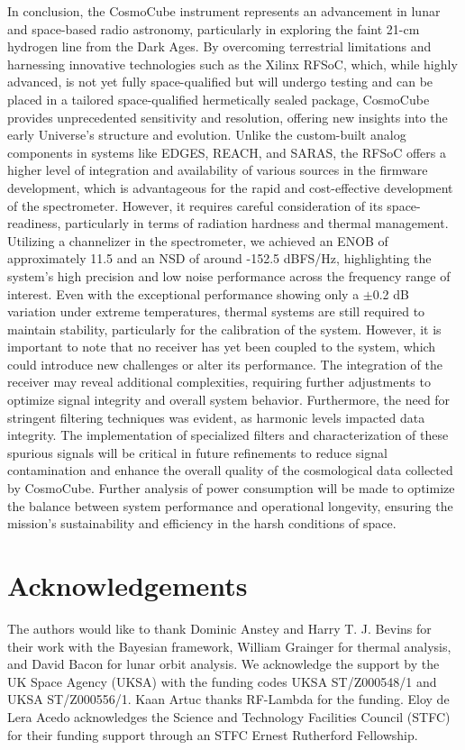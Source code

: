 \documentclass[fleqn,usenatbib]{rasti}
\begin{document}
In conclusion, the CosmoCube instrument represents an advancement in lunar and space-based radio astronomy, particularly in exploring the faint 21-cm hydrogen line from the Dark Ages. By overcoming terrestrial limitations and harnessing innovative technologies such as the Xilinx RFSoC, which, while highly advanced, is not yet fully space-qualified but will undergo testing and can be placed in a tailored space-qualified hermetically sealed package, CosmoCube provides unprecedented sensitivity and resolution, offering new insights into the early Universe's structure and evolution. Unlike the custom-built analog components in systems like EDGES, REACH, and SARAS, the RFSoC offers a higher level of integration and availability of various sources in the firmware development, which is advantageous for the rapid and cost-effective development of the spectrometer. However, it requires careful consideration of its space-readiness, particularly in terms of radiation hardness and thermal management. Utilizing a channelizer in the spectrometer, we achieved an ENOB of approximately 11.5 and an NSD of around -152.5 dBFS/Hz, highlighting the system’s high precision and low noise performance across the frequency range of interest. Even with the exceptional performance showing only a $\pm$0.2 dB variation under extreme temperatures, thermal systems are still required to maintain stability, particularly for the calibration of the system. However, it is important to note that no receiver has yet been coupled to the system, which could introduce new challenges or alter its performance. The integration of the receiver may reveal additional complexities, requiring further adjustments to optimize signal integrity and overall system behavior. Furthermore, the need for stringent filtering techniques was evident, as harmonic levels impacted data integrity. The implementation of specialized filters and characterization of these spurious signals will be critical in future refinements to reduce signal contamination and enhance the overall quality of the cosmological data collected by CosmoCube. Further analysis of power consumption will be made to optimize the balance between system performance and operational longevity, ensuring the mission’s sustainability and efficiency in the harsh conditions of space.

\section*{Acknowledgements}

The authors would like to thank Dominic Anstey and Harry T. J. Bevins for their work with the Bayesian framework, William Grainger for thermal analysis, and David Bacon for lunar orbit analysis. We acknowledge the support by the UK Space Agency (UKSA) with the funding codes UKSA ST/Z000548/1 and UKSA ST/Z000556/1. Kaan Artuc thanks RF-Lambda for the funding. Eloy de Lera Acedo acknowledges the Science and Technology Facilities Council (STFC) for their funding support through an STFC Ernest Rutherford Fellowship.
\end{document}
